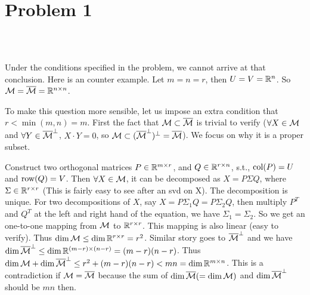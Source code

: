 \section{Problem 1}~\label{sec:prob1}

\subsection{} %

Under the conditions specified in the problem,
we cannot arrive at that conclusion.
Here is an counter example.
Let $m=n=r$, then $U=V={\mathbb{R}}^n$.
So ${\mathcal{M}}={\overline{{\mathcal{M}}}}={\mathbb{R}}^{n\times n}$.

To make this question more sensible,
let us impose an extra condition that
$r<\min(m,n)=m$.
First the fact that ${\mathcal{M}} \subset {\overline{{\mathcal{M}}}}$ is trivial to verify
($\forall X \in {\mathcal{M}}$ and $\forall Y \in {\overline{{\mathcal{M}}}}^\perp$, $X\cdot Y=0$,
so ${\mathcal{M}} \subset ({\overline{{\mathcal{M}}}}^\perp)^\perp={\overline{{\mathcal{M}}}}$).
We focus on why it is a proper subset.

Construct two orthogonal matrices $P\in{\mathbb{R}}^{m\times r}$,
and $Q\in {\mathbb{R}}^{r\times n}$, s.t.,
${\text{col}}(P)=U$ and ${\text{row}}(Q)=V$.
Then $\forall X\in{\mathcal{M}}$, it can be decomposed as
$X=P\Sigma Q$, where $\Sigma\in{\mathbb{R}}^{r\times r}$
(This is fairly easy to see after an svd on X).
The decomposition is unique.
For two decompositions of $X$,
say $X=P\Sigma_1 Q=P\Sigma_2 Q$,
then multiply $P^T$ and $Q^T$ at the left and right hand of the equation,
we have $\Sigma_1=\Sigma_2$.
So we get an one-to-one mapping from ${\mathcal{M}}$ to ${\mathbb{R}}^{r\times r}$.
This mapping is also linear (easy to verify).
Thus $\dim {\mathcal{M}} \le \dim {\mathbb{R}}^{r\times r} = r^2$.
Similar story goes to ${\overline{{\mathcal{M}}}}^\perp$ and we have
$\dim {\overline{{\mathcal{M}}}}^\perp \le \dim {\mathbb{R}}^{(m-r)\times(n-r)} = (m-r)(n-r)$.
Thus $\dim {\mathcal{M}} + \dim {\overline{{\mathcal{M}}}}^\perp \le r^2 + (m-r)(n-r) < mn = \dim {\mathbb{R}}^{m\times n}$.
This is a contradiction if ${\mathcal{M}}={\overline{{\mathcal{M}}}}$ because
the sum of $\dim {\overline{{\mathcal{M}}}}(=\dim {\mathcal{M}})$ and $\dim {\overline{{\mathcal{M}}}}^\perp$ should be $mn$ then.

\subsection{} %


